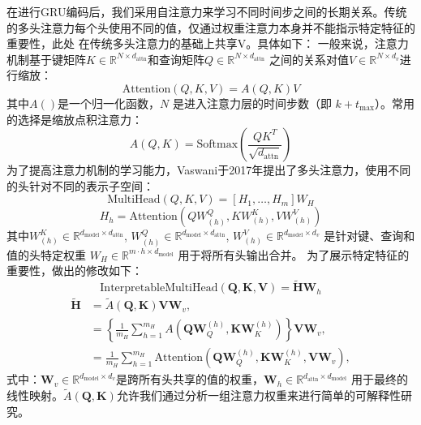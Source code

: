 在进行GRU编码后，我们采用自注意力来学习不同时间步之间的长期关系。传统的多头注意力每个头使用不同的值，仅通过权重注意力本身并不能指示特定特征的重要性，此处
在传统多头注意力的基础上共享V。具体如下：
一般来说，注意力机制基于键矩阵\( K \in \mathbb{R}^{N \times d_{\text{attn}}} \)和查询矩阵\( Q \in \mathbb{R}^{N \times d_{\text{attn}}} \)
之间的关系对值\( V \in \mathbb{R}^{N \times d_v} \)进行缩放：
\begin{equation}
    \text{Attention}(Q, K, V) = A(Q,K)V
\end{equation}
其中$A()$是一个归一化函数，\( N \) 是进入注意力层的时间步数（即 \( k + t_{\text{max}} \)）。常用的选择是缩放点积注意力：
\begin{equation}
    A(Q, K) = \text{Softmax}\left(\frac{QK^T}{\sqrt{d_{\text{attn}}}}\right)
\end{equation}
为了提高注意力机制的学习能力，Vaswani于2017年提出了多头注意力，使用不同的头针对不同的表示子空间：
\begin{equation}
    \text{MultiHead}(Q, K, V) = [H_1, \ldots, H_m]W_H
\end{equation}
\begin{equation}
    H_h = \text{Attention}(QW^Q_{(h)}, KW^K_{(h)}, VW^V_{(h)})
\end{equation}
其中\( W^K_{(h)} \in \mathbb{R}^{d_{\text{model}} \times d_{\text{attn}}} \), \( W^Q_{(h)} \in \mathbb{R}^{d_{\text{model}} \times d_{\text{attn}}} \), \( W^V_{(h)} \in \mathbb{R}^{d_{\text{model}} \times d_v} \) 
是针对键、查询和值的头特定权重 \( W_H \in \mathbb{R}^{m \cdot h \times d_{\text{model}}} \) 用于将所有头输出合并。
为了展示特定特征的重要性，做出的修改如下：
\begin{equation}
    \text{InterpretableMultiHead}(\mathbf{Q}, \mathbf{K}, \mathbf{V}) = \tilde{\mathbf{H}} \mathbf{W}_h
\end{equation}
\begin{equation}
    \begin{aligned}
        \mathbf{\tilde{H}} &= \tilde{A}(\mathbf{Q}, \mathbf{K}) \mathbf{V} \mathbf{W}_v, \\
        &= \left\{ \frac{1}{m_H} \sum_{h=1}^{m_H} A(\mathbf{Q} \mathbf{W}_Q^{(h)}, \mathbf{K} \mathbf{W}_K^{(h)}) \right\} \mathbf{V} \mathbf{W}_v, \\
        &= \frac{1}{m_H} \sum_{h=1}^{m_H} \text{Attention}(\mathbf{Q} \mathbf{W}_Q^{(h)}, \mathbf{K} \mathbf{W}_K^{(h)}, \mathbf{V} \mathbf{W}_v),
    \end{aligned}        
\end{equation}
式中：$\mathbf{W}_v \in \mathbb{R}^{d_{\text{model}} \times d_v}$是跨所有头共享的值的权重，$\mathbf{W}_h \in \mathbb{R}^{d_{\text{attn}} \times d_{\text{model}}}$
用于最终的线性映射。$\tilde{A}(\mathbf{Q}, \mathbf{K})$允许我们通过分析一组注意力权重来进行简单的可解释性研究。

